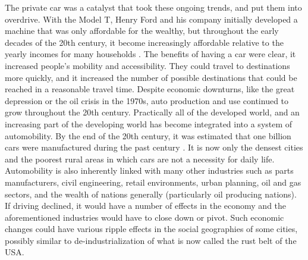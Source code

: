 The private car was a catalyst that took these ongoing trends, and put them into overdrive. With the Model T, Henry Ford and his company initially developed a machine that was only affordable for the wealthy, but throughout the early decades of the 20th century, it become increasingly affordable relative to the yearly incomes for many households \cite{kunstler_geography_1994}. The benefits of having a car were clear, it increased people's mobility and accessibility. They could travel to destinations more quickly, and it increased the number of possible destinations that could be reached in a reasonable travel time. Despite economic downturns, like the great depression or the oil crisis in the 1970s, auto production and use continued to grow throughout the 20th century. Practically all of the developed world, and an increasing part of the developing world has become integrated into a system of automobility. By the end of the 20th century, it was estimated that one billion cars were manufactured during the past century \cite{urry_systemautomobility_2004}. It is now only the densest cities and the poorest rural areas in which cars are not a necessity for daily life. Automobility is also inherently linked with many other industries such as parts manufacturers, civil engineering, retail environments, urban planning, oil and gas sectors, and the wealth of nations generally (particularly oil producing nations). If driving declined, it would have a number of effects in the economy and the aforementioned industries would have to close down or pivot. Such economic changes could have various ripple effects in the social geographies of some cities, possibly similar to de-industrialization of what is now called the rust belt of the USA.

